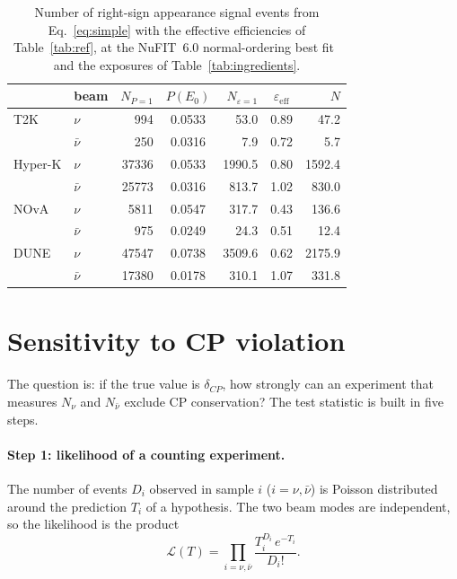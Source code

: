 \documentclass[11pt,a4paper]{article}
\begin{document}
\begin{table}[ht]
\centering
\caption{Number of right-sign appearance signal events from Eq.~\eqref{eq:simple} with the effective efficiencies
of Table~\ref{tab:ref}, at the NuFIT~6.0 normal-ordering best fit~\cite{Esteban:2024eli} and the exposures of
Table~\ref{tab:ingredients}.}
\label{tab:results}
\begin{tabular}{llrcrcr}
\toprule
 & beam & $N_{P=1}$ & $P(E_0)$ & $N_{\varepsilon=1}$ & $\varepsilon_\text{eff}$ & $N$ \\
\midrule
T2K     & $\nu$     & 994   & 0.0533 & 53.0   & 0.89 & 47.2   \\
        & $\bar\nu$ & 250   & 0.0316 & 7.9    & 0.72 & 5.7    \\
Hyper-K & $\nu$     & 37336 & 0.0533 & 1990.5 & 0.80 & 1592.4 \\
        & $\bar\nu$ & 25773 & 0.0316 & 813.7  & 1.02 & 830.0  \\
NOvA    & $\nu$     & 5811  & 0.0547 & 317.7  & 0.43 & 136.6  \\
        & $\bar\nu$ & 975   & 0.0249 & 24.3   & 0.51 & 12.4   \\
DUNE    & $\nu$     & 47547 & 0.0738 & 3509.6 & 0.62 & 2175.9 \\
        & $\bar\nu$ & 17380 & 0.0178 & 310.1  & 1.07 & 331.8  \\
\bottomrule
\end{tabular}
\end{table}

\section{Sensitivity to CP violation}
\label{sec:chi2}

The question is: if the true value is $\delta_{CP}$, how strongly can an experiment that measures
$N_\nu$ and $N_{\bar\nu}$ exclude CP conservation? The test statistic is built in five steps.

\paragraph{Step 1: likelihood of a counting experiment.}
The number of events $D_i$ observed in sample $i$ ($i=\nu,\bar\nu$) is Poisson distributed around the
prediction $T_i$ of a hypothesis. The two beam modes are independent, so the likelihood is the product
\begin{equation}
  \mathcal L(T) = \prod_{i=\nu,\bar\nu} \frac{T_i^{D_i}\,e^{-T_i}}{D_i!} .
\end{equation}
\end{document}
